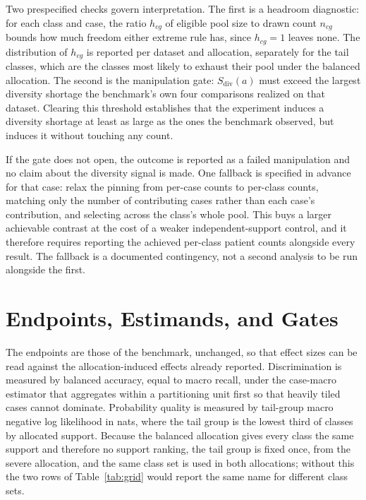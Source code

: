 \documentclass[11pt]{article}
\begin{document}
Two prespecified checks govern interpretation. The first is a headroom diagnostic: for each class and case, the ratio $h_{cg}$ of eligible pool size to drawn count $n_{cg}$ bounds how much freedom either extreme rule has, since $h_{cg}=1$ leaves none. The distribution of $h_{cg}$ is reported per dataset and allocation, separately for the tail classes, which are the classes most likely to exhaust their pool under the balanced allocation. The second is the manipulation gate: $S_{\mathrm{div}}(a)$ must exceed the largest diversity shortage the benchmark's own four comparisons realized on that dataset. Clearing this threshold establishes that the experiment induces a diversity shortage at least as large as the ones the benchmark observed, but induces it without touching any count.

If the gate does not open, the outcome is reported as a failed manipulation and no claim about the diversity signal is made. One fallback is specified in advance for that case: relax the pinning from per-case counts to per-class counts, matching only the number of contributing cases rather than each case's contribution, and selecting across the class's whole pool. This buys a larger achievable contrast at the cost of a weaker independent-support control, and it therefore requires reporting the achieved per-class patient counts alongside every result. The fallback is a documented contingency, not a second analysis to be run alongside the first.

\section{Endpoints, Estimands, and Gates}
\label{sec:endpoints}
The endpoints are those of the benchmark, unchanged, so that effect sizes can be read against the allocation-induced effects already reported. Discrimination is measured by balanced accuracy, equal to macro recall, under the case-macro estimator that aggregates within a partitioning unit first so that heavily tiled cases cannot dominate. Probability quality is measured by tail-group macro negative log likelihood in nats, where the tail group is the lowest third of classes by allocated support. Because the balanced allocation gives every class the same support and therefore no support ranking, the tail group is fixed once, from the severe allocation, and the same class set is used in both allocations; without this the two rows of Table~\ref{tab:grid} would report the same name for different class sets.
\end{document}
